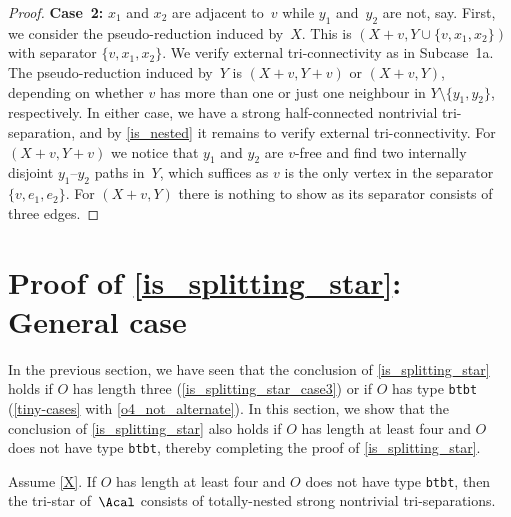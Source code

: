 \documentclass{aic}
\theoremstyle{plain}
\theoremstyle{definition}
\theoremstyle{plain}
\theoremstyle{plain}
\newcommand{\sm}{\setminus}
\newcommand{\ty}[1]{{\tt#1}}
\begin{document}
\begin{proof}
\textbf{Case~2:} 
$x_1$ and $x_2$ are adjacent to~$v$ while $y_1$ and~$y_2$ are not, say.
First, we consider the pseudo-reduction induced by~$X$.
This is $(X+v,Y\cup\{v,x_1,x_2\})$ with separator $\{v,x_1,x_2\}$.
We verify external tri-connectivity as in Subcase~1a.
The pseudo-reduction induced by~$Y$ is $(X+v,Y+v)$ or $(X+v,Y)$, depending on whether $v$ has more than one or just one neighbour in $Y\sm\{y_1,y_2\}$, respectively.
In either case, we have a strong half-connected nontrivial tri-separation, and by \autoref{is_nested} it remains to verify external tri-connectivity.
For $(X+v,Y+v)$ we notice that $y_1$ and $y_2$ are $v$-free and find two internally disjoint $y_1$--$y_2$ paths in~$Y$, which suffices as $v$ is the only vertex in the separator $\{v,e_1,e_2\}$.
For $(X+v,Y)$ there is nothing to show as its separator consists of three edges.
\end{proof}




\section[General case]{Proof of \autoref{is_splitting_star}: General case}\label{sec:GeneralAngry}

In the previous section, we have seen that the conclusion of \autoref{is_splitting_star} holds if $O$ has length three (\autoref{is_splitting_star_case3}) or if $O$ has type \ty{btbt} (\autoref{tiny-cases} with \autoref{o4_not_alternate}).
In this section, we show that the conclusion of \autoref{is_splitting_star} also holds if $O$ has length at least four and $O$ does not have type \ty{btbt}, thereby completing the proof of \autoref{is_splitting_star}.

\begin{lem}\label{ApexGeneral}
Assume \autoref{X}.
If $O$ has length at least four and $O$ does not have type \ty{btbt}, then the tri-star of~$\Acal$ consists of totally-nested strong nontrivial tri-separations.
\end{lem}
\end{document}
